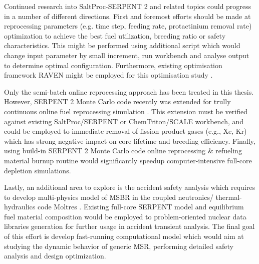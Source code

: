 Continued research into SaltProc-SERPENT 2 and related topics could progress in a number of different directions. First and foremost efforts should be made at reprocessing parameters (e.g. time step, feeding rate, protactinium removal
rate) optimization to achieve the best fuel utilization, breeding ratio or safety characteristics. This might be performed using additional script which would change input parameter by small increment, run workbench and analyse output to determine optimal configuration. Furthermore, existing optimisation framework RAVEN might be employed for this optimisation study \cite{alfonsi_raven_2013}.

Only the semi-batch online reprocessing approach has been treated in this thesis. However, SERPENT 2 Monte Carlo code recently was extended for trully continuous online fuel reprocessing simulation \cite{aufiero_extended_2013}. This extension must be verified against existing SaltProc/SERPENT or ChemTriton/SCALE workbench, and could be employed to immediate removal of fission product gases (e.g., Xe, Kr) which has strong negative impact on core lifetime and breeding efficiency. Finally, using build-in SERPENT 2 Monte Carlo code online reprocessing \& refueling material burnup routine would significantly speedup computer-intensive full-core depletion simulations.

Lastly, an additional area to explore is the accident safety analysis which requires to develop multi-physics model of \gls{MSBR} in the coupled neutronics/ thermal-hydraulics code Moltres \cite{lindsay_introduction_2018}. Existing full-core SERPENT model and equilibrium fuel material composition would be employed to problem-oriented nuclear data libraries generation for further usage in accident transient analysis. The final goal of this effort is develop fast-running computational model which would aim at studying the dynamic behavior of generic \gls{MSR}, performing detailed safety analysis and design optimization.

